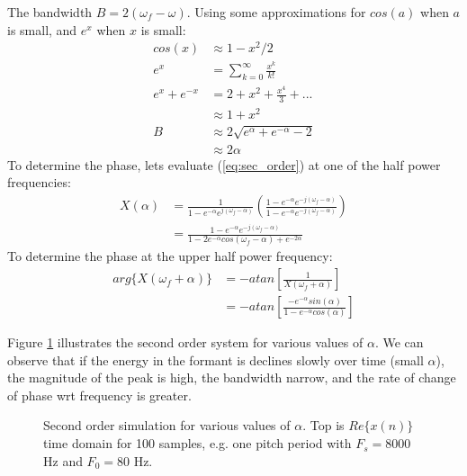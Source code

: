 \documentclass{article}
\begin{document}
The bandwidth $B=2(\omega_f - \omega)$.  Using some approximations for $cos(a)$ when $a$ is small, and $e^x$ when $x$ is small:
\begin{equation}
\begin{split}
cos(x) &\approx 1-x^2/2 \\
e^x &= \sum_{k=0}^{\infty}\frac{x^k}{k!} \\
e^x + e^{-x} &= 2 + x^2 + \frac{x^4}{3} + ... \\
             &\approx 1 + x^2     \\
B &\approx 2\sqrt{e^\alpha+e^{-\alpha}-2} \\
  &\approx 2\alpha
\end{split}
\end{equation}
To determine the phase, lets evaluate (\ref{eq:sec_order}) at one of the half power frequencies:
\begin{equation}
\begin{split}
X(\alpha) &= \frac{1}{1 - e^{-\alpha}e^{j (\omega_f - \alpha)}} \left(\frac{1 - e^{-\alpha}e^{-j (\omega_f - \alpha)}}{1 - e^{-\alpha}e^{-j (\omega_f - \alpha)}} \right)\\
         &= \frac{1 - e^{-\alpha}e^{-j (\omega_f - \alpha)}}{1-2e^{-\alpha}cos(\omega_f-\alpha) + e^{-2\alpha}}
\end{split}
\end{equation}
To determine the phase at the upper half power frequency:
\begin{equation}
\begin{split}
arg\{X(\omega_f + \alpha)\} &= -atan\left[\frac{1}{X(\omega_f+\alpha)}\right] \\
                 &= - atan\left[\frac{-e^{-\alpha}sin(\alpha)}{1-e^{-\alpha} cos(\alpha)}\right]
\end{split}
\end{equation}

Figure \ref{fig:sec_order} illustrates the second order system for various values of $\alpha$. We can observe that if the energy in the formant is declines slowly over time (small $\alpha$), the magnitude of the peak is high, the bandwidth narrow, and the rate of change of phase wrt frequency is greater.
 	
\begin{figure}
\caption{Second order simulation for various values of $\alpha$. Top is $Re\{x(n)\}$ time domain for 100 samples, e.g. one pitch period with $F_s=8000$ Hz and $F_0=80$ Hz.}
\label{fig:sec_order}
\begin{center}

\end{center}
\end{figure}



\end{document}

